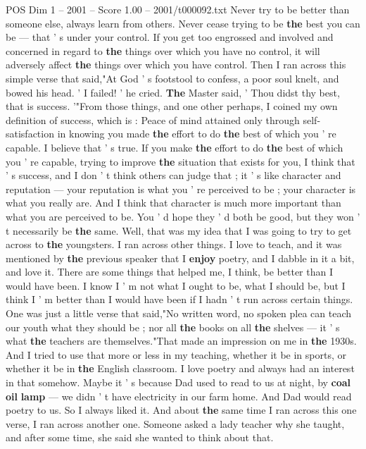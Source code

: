 \begin{textsample}{POS Dim 1 – 2001 – Score 1.00 – 2001/t000092.txt}
Never try to be better than someone else, always learn from others.
Never cease trying to be \textbf{the} best you can be — that ' s under your control.
If you get too engrossed and involved and concerned in regard to \textbf{the} things over which you have no control, it will adversely affect \textbf{the} things over which you have control.
Then I ran across this simple verse that said,"At God ' s footstool to confess, a poor soul knelt, and bowed his head. ' I failed! ' he cried. \textbf{The} Master said, ' Thou didst thy best, that is success. '"From those things, and one other perhaps, I coined my own definition of success, which is : Peace of mind attained only through self-satisfaction in knowing you made \textbf{the} effort to do \textbf{the} best of which you ' re capable.
I believe that ' s true.
If you make \textbf{the} effort to do \textbf{the} best of which you ' re capable, trying to improve \textbf{the} situation that exists for you, I think that ' s success, and I don ' t think others can judge that ; it ' s like character and reputation — your reputation is what you ' re perceived to be ; your character is what you really are.
And I think that character is much more important than what you are perceived to be.
You ' d hope they ' d both be good, but they won ' t necessarily be \textbf{the} same.
Well, that was my idea that I was going to try to get across to \textbf{the} youngsters.
I ran across other things.
I love to teach, and it was mentioned by \textbf{the} previous speaker that I \textbf{enjoy} poetry, and I dabble in it a bit, and love it.
There are some things that helped me, I think, be better than I would have been.
I know I ' m not what I ought to be, what I should be, but I think I ' m better than I would have been if I hadn ' t run across certain things.
One was just a little verse that said,"No written word, no spoken plea can teach our youth what they should be ; nor all \textbf{the} books on all \textbf{the} shelves — it ' s what \textbf{the} teachers are themselves."That made an impression on me in \textbf{the} 1930s.
And I tried to use that more or less in my teaching, whether it be in sports, or whether it be in \textbf{the} English classroom.
I love poetry and always had an interest in that somehow.
Maybe it ' s because Dad used to read to us at night, by \textbf{coal} \textbf{oil} \textbf{lamp} — we didn ' t have electricity in our farm home.
And Dad would read poetry to us.
So I always liked it.
And about \textbf{the} same time I ran across this one verse, I ran across another one.
Someone asked a lady teacher why she taught, and after some time, she said she wanted to think about that.

\end{textsample}
